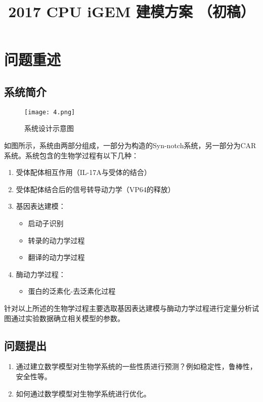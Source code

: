 \documentclass[withoutpreface,bwprint]{cumcmthesis} %
\title{2017 CPU iGEM 建模方案 （初稿）}
\begin{document}
\setcounter{secnumdepth}{3}
 \maketitle

\section{问题重述} 

\subsection{系统简介}
\begin{figure}[!h]
	\centering
	\texttt{[image: 4.png]}
	\caption{系统设计示意图}
\end{figure}
如图所示，系统由两部分组成，一部分为构造的Syn-notch系统，另一部分为CAR系统。系统包含的生物学过程有以下几种：

\begin{enumerate}[itemindent=2em]
\item 受体配体相互作用（IL-17A与受体的结合）
\item 受体配体结合后的信号转导动力学（VP64的释放）
\item 基因表达建模：
\begin{itemize}[itemindent=1em]
	\item 启动子识别
	\item 转录的动力学过程
	\item 翻译的动力学过程
\end{itemize}
\item 酶动力学过程：
\begin{itemize}[itemindent=1em]
	\item 蛋白的泛素化-去泛素化过程
\end{itemize}
\end{enumerate}

针对以上所述的生物学过程主要选取基因表达建模与酶动力学过程进行定量分析试图通过实验数据确立相关模型的参数。

\subsection{问题提出}

\begin{enumerate}[itemindent=2em]
\item 通过建立数学模型对生物学系统的一些性质进行预测？例如稳定性，鲁棒性，安全性等。
\item 如何通过数学模型对生物学系统进行优化。
\end{enumerate}
 
\end{document}
